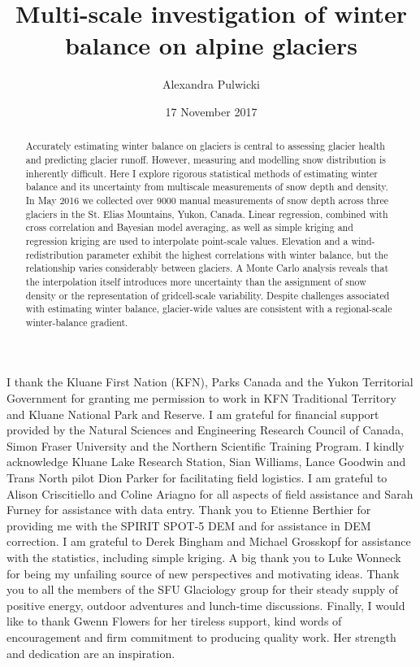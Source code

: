\documentclass{sfuthesis}
\title{Multi-scale investigation of winter balance on alpine glaciers}
\author{Alexandra Pulwicki}
\date{17 November 2017}
\begin{document}
\frontmatter
\maketitle{}
\makecommittee{}

\begin{abstract}
	Accurately estimating winter balance on glaciers is central to assessing glacier health and predicting glacier runoff. However, measuring and modelling snow distribution is inherently difficult. Here I explore rigorous statistical methods of estimating winter balance and its uncertainty from multiscale measurements of snow depth and density. In May 2016 we collected over 9000 manual measurements of snow depth across three glaciers in the St. Elias Mountains, Yukon, Canada. Linear regression, combined with cross correlation and Bayesian model averaging, as well as simple kriging and regression kriging are used to interpolate point-scale values. Elevation and a wind-redistribution parameter exhibit the highest correlations with winter balance, but the relationship varies considerably between glaciers. A Monte Carlo analysis reveals that the interpolation itself introduces more uncertainty than the assignment of snow density or the representation of gridcell-scale variability. Despite challenges associated with estimating winter balance, {\color{red} glacier-wide values} are consistent with a regional-scale winter-balance gradient.
\end{abstract}




\begin{acknowledgements}
I thank the Kluane First Nation (KFN), Parks Canada and the Yukon Territorial Government for granting me permission to work in KFN Traditional Territory and Kluane National Park and Reserve. I am grateful for financial support provided by the Natural Sciences and Engineering Research Council of  Canada, Simon Fraser University and the Northern Scientific  Training Program. I kindly acknowledge Kluane Lake Research Station, Sian Williams, Lance Goodwin and Trans North pilot Dion Parker for facilitating field logistics. I am grateful to Alison Criscitiello and Coline Ariagno for all aspects of field assistance and Sarah Furney for assistance with data entry. Thank you to Etienne Berthier for providing me with the SPIRIT SPOT-5 DEM and for assistance in DEM correction. I am grateful to Derek Bingham and Michael Grosskopf for assistance with the statistics, including simple kriging. A big thank you to Luke Wonneck for being my unfailing source of new perspectives and motivating ideas. Thank you to all the members of the SFU Glaciology group for their steady supply of positive energy, outdoor adventures and lunch-time discussions. Finally, I would like to thank Gwenn Flowers for her tireless support, kind words of encouragement and firm commitment to producing quality work. Her strength and dedication are an inspiration. 
\end{acknowledgements}
\end{document}
